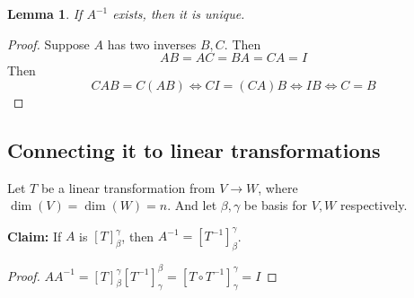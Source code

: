 \documentclass{article}
\newtheorem{lemma}[theorem]{Lemma}
\newtheorem{one minute paper}[theorem]{One Minute Paper}
\begin{document}
\begin{lemma}
    If $A^{-1}$ exists, then it is unique. 
\end{lemma}
\begin{proof}
    Suppose $A$ has two inverses $B, C$. Then 
    \begin{equation}
        AB = AC = BA = CA = I
    \end{equation}
    Then 
    \begin{equation}
        CAB = C(AB) \iff CI = (CA)B \iff IB \iff C = B
    \end{equation}
\end{proof}

\subsection*{Connecting it to linear transformations}

Let $T$ be a linear transformation from $V \rightarrow W$, where $\dim(V) = \dim(W) = n$. And let $\beta, \gamma$ be basis for $V, W$ respectively. 

\textbf{Claim:} If $A$ is $[T]_\beta^\gamma$, then $A^{-1} = [T^{-1}]_\beta^\gamma$. 

\begin{proof}
    $AA^{-1} = [T]_\beta^\gamma[T^{-1}]_\gamma^\beta = [T \circ T^{-1}]_\gamma^\gamma = I$
\end{proof}
\end{document}
